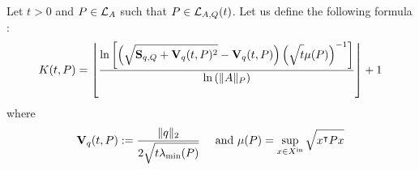 \documentclass[10pt]{article}
\begin{document}
\begin{comment}
Let $t>0$ and $P\in\lyat{A,Q}$. Let us define the following formula :
\begin{equation}
\label{kappat}
\kappa_t(P)=  \dfrac{\ln\left(\mu_{\xin}(Q)\mu_{\xin}(P)^{-1}t^{-1}\right)}{\ln\left(\norm{A}_P^2\right)}
\end{equation}

Let $P\in\lyap{A}$. We define the following formula :
\begin{equation}
\label{kappainf}
\kappa_\infty(P)= \dfrac{\ln\left(\mu_{\xin}(Q)\mu_{\xin}(P)^{-1}\lambda_d(P)\lambda_1(Q)^{-1}\right)}{\ln\left(\norm{A}_P^2\right)}
\end{equation}
\end{comment}

Let $t>0$ and $P\in\mathcal{L}_{A}$ such that $P\in \mathcal{L}_{A,Q}(t)$. Let us define the following formula :
\begin{equation}
K(t,P)=\left\lfloor \dfrac{\ln\left[\left(\sqrt{\strut \mathbf{S}_{q,Q}+\mathbf{V}_{q}(t,P)^2}-\mathbf{V}_{q}(t,P)\right)\left(\sqrt{\strut t}\mu(P)\right)^{-1}\right]}{\ln\left(\| A\|_P\right)}\right\rfloor+1
\end{equation}
where 
\[
\mathbf{V}_{q}(t,P):=\dfrac{\| q\|_2 }{2\sqrt{\strut t\lambda_{\operatorname{min}}(P)}}\quad \text{ and } \mu(P)=\sup_{x\in X^\mathrm{in}} \sqrt{\strut x^\intercal P x}
\]
\end{document}
